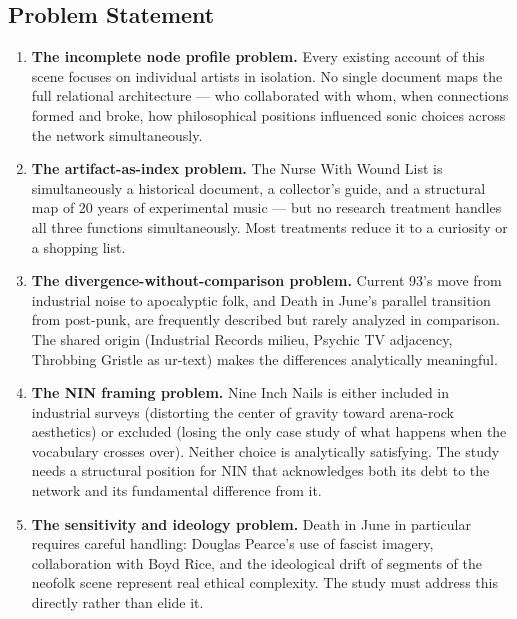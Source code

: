 \documentclass[11pt,letterpaper]{article}
\begin{document}
\subsection{Problem Statement}

\begin{enumerate}
  \item \textbf{The incomplete node profile problem.} Every existing account of this scene focuses on
    individual artists in isolation. No single document maps the full relational architecture — who
    collaborated with whom, when connections formed and broke, how philosophical positions influenced
    sonic choices across the network simultaneously.

  \item \textbf{The artifact-as-index problem.} The Nurse With Wound List is simultaneously a
    historical document, a collector's guide, and a structural map of 20 years of experimental
    music — but no research treatment handles all three functions simultaneously. Most treatments
    reduce it to a curiosity or a shopping list.

  \item \textbf{The divergence-without-comparison problem.} Current 93's move from industrial noise
    to apocalyptic folk, and Death in June's parallel transition from post-punk, are frequently
    described but rarely analyzed in comparison. The shared origin (Industrial Records milieu, Psychic
    TV adjacency, Throbbing Gristle as ur-text) makes the differences analytically meaningful.

  \item \textbf{The NIN framing problem.} Nine Inch Nails is either included in industrial surveys
    (distorting the center of gravity toward arena-rock aesthetics) or excluded (losing the only case
    study of what happens when the vocabulary crosses over). Neither choice is analytically satisfying.
    The study needs a structural position for NIN that acknowledges both its debt to the network and
    its fundamental difference from it.

  \item \textbf{The sensitivity and ideology problem.} Death in June in particular requires careful
    handling: Douglas Pearce's use of fascist imagery, collaboration with Boyd Rice, and the ideological
    drift of segments of the neofolk scene represent real ethical complexity. The study must address this
    directly rather than elide it.
\end{enumerate}
\end{document}
